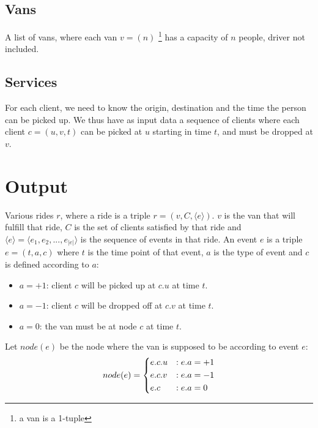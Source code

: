 \subsection{Vans} \label{problem-formalization-input-vans}
A list of vans, where each van $v=(n)$ \footnote{a van is a 1-tuple} has a capacity of $n$ people, driver not included.
\subsection{Services} \label{problem-formalization-input-services}
For each client, we need to know the origin, destination and the time the person can be picked up.
We thus have as input data a sequence of clients where each client $c=(u, v, t)$ can be picked at $u$ starting in time $t$, and must be dropped at $v$.
\section{Output} \label{problem-formalization-output}
Various rides $r$, where a ride is a triple $r=(v, C, \langle e \rangle)$. $v$ is the van that will fulfill that ride, $C$ is the set of clients satisfied by that ride and $\langle e \rangle = \langle e_1, e_2,...,e_{|e|} \rangle$ is the sequence of events in that ride. An event $e$ is a triple $e=(t, a, c)$ where $t$ is the time point of that event, $a$ is the type of event and $c$ is defined according to $a$:
\begin{itemize}
    \item $a=+1$: client $c$ will be picked up at $c.u$ at time $t$.
    \item $a=-1$: client $c$ will be dropped off at $c.v$ at time $t$.
    \item $a=0$: the van must be at node $c$ at time $t$.
\end{itemize}
Let $node(e)$ be the node where the van is supposed to be according to event $e$:
\begin{equation*}
    node(e)=\begin{dcases}
        e.c.u & : e.a = +1\\
        e.c.v & : e.a = -1\\
        e.c   & : e.a = 0
    \end{dcases}
\end{equation*}
